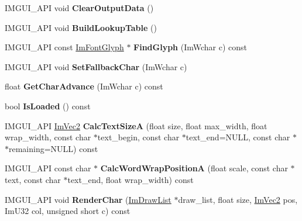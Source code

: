 \begin{DoxyCompactItemize}
\item 
\mbox{\label{struct_im_font_aecf7773b1c40b433f91ee245f463de12}} 
I\+M\+G\+U\+I\+\_\+\+A\+PI void {\bfseries Clear\+Output\+Data} ()
\item 
\mbox{\label{struct_im_font_a04b3a1437bd0032722bbbd3613941162}} 
I\+M\+G\+U\+I\+\_\+\+A\+PI void {\bfseries Build\+Lookup\+Table} ()
\item 
\mbox{\label{struct_im_font_ac6a773b73c6406fd8f08c4c93213a501}} 
I\+M\+G\+U\+I\+\_\+\+A\+PI const \hyperlink{struct_im_font_glyph}{Im\+Font\+Glyph} $\ast$ {\bfseries Find\+Glyph} (Im\+Wchar c) const
\item 
\mbox{\label{struct_im_font_a1f504f78cc066db20ea2d688e73a560b}} 
I\+M\+G\+U\+I\+\_\+\+A\+PI void {\bfseries Set\+Fallback\+Char} (Im\+Wchar c)
\item 
\mbox{\label{struct_im_font_adffcff4e4e2d17455410bd4ba76b42e4}} 
float {\bfseries Get\+Char\+Advance} (Im\+Wchar c) const
\item 
\mbox{\label{struct_im_font_a97dafa61cc94e84be396d69b0d42b1ce}} 
bool {\bfseries Is\+Loaded} () const
\item 
\mbox{\label{struct_im_font_ad67f64fd206ad197f4b93b1a1ae27cfe}} 
I\+M\+G\+U\+I\+\_\+\+A\+PI \hyperlink{struct_im_vec2}{Im\+Vec2} {\bfseries Calc\+Text\+SizeA} (float size, float max\+\_\+width, float wrap\+\_\+width, const char $\ast$text\+\_\+begin, const char $\ast$text\+\_\+end=N\+U\+LL, const char $\ast$$\ast$remaining=N\+U\+LL) const
\item 
\mbox{\label{struct_im_font_a3781bb82a1ceba919cb6c98a398c7a67}} 
I\+M\+G\+U\+I\+\_\+\+A\+PI const char $\ast$ {\bfseries Calc\+Word\+Wrap\+PositionA} (float scale, const char $\ast$text, const char $\ast$text\+\_\+end, float wrap\+\_\+width) const
\item 
\mbox{\label{struct_im_font_af602fe8f445ae4142436ee3e6baa3ede}} 
I\+M\+G\+U\+I\+\_\+\+A\+PI void {\bfseries Render\+Char} (\hyperlink{struct_im_draw_list}{Im\+Draw\+List} $\ast$draw\+\_\+list, float size, \hyperlink{struct_im_vec2}{Im\+Vec2} pos, Im\+U32 col, unsigned short c) const
$$
\end{DoxyCompactItemize}
